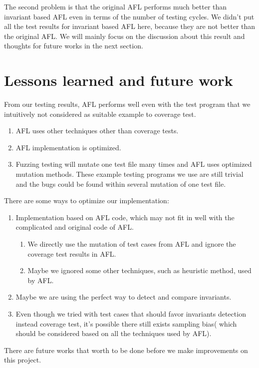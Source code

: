 \documentclass[sigplan,10pt,review = false]{acmart}\settopmatter{printfolios=true,printccs=false,printacmref=false}
\begin{document}
The second problem is that the original AFL performs much better than invariant based AFL even in terms of the number of testing cycles. We didn't put all the test results for invariant based AFL here, because they are not better than the original AFL. We will mainly focus on the discussion about this result and thoughts for future works in the next section. \\


\section{Lessons learned and future work}
From our testing results, AFL performs well even with the test program that we intuitively not considered as suitable example to coverage test.
\begin{enumerate}
\item AFL uses other techniques other than coverage tests.
\item AFL implementation is optimized.
\item Fuzzing testing will mutate one test file many times and AFL uses optimized mutation methods. These example testing programs we use are still trivial and the bugs could be found within several mutation of one test file.
\end{enumerate}
There are some ways to optimize our implementation:
\begin{enumerate}
\item Implementation based on AFL code, which may not fit in well with the complicated and original code of AFL.
\begin{enumerate}
\item We directly use the mutation of test cases from AFL and ignore the coverage test results in AFL.
\item Maybe we ignored some other techniques, such as heuristic method, used by AFL.
\end{enumerate}
\item Maybe we are using the perfect way to detect and compare invariants.
\item Even though we tried with test cases that should favor invariants detection instead coverage test, it's possible there still exists sampling bias( which should be considered based on all the techniques used by AFL).
\end{enumerate}
There are future works that worth to be done before we make improvements on this project. 
\end{document}
